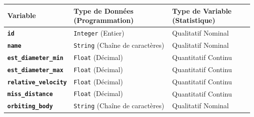\documentclass[11pt]{article}
\begin{document}
\begin{longtable}[]{@{}
  >{\raggedright\arraybackslash}p{}
  >{\raggedright\arraybackslash}p{}
  >{\raggedright\arraybackslash}p{}@{}}
  \toprule\noalign{}
  \begin{minipage}[b]{\linewidth}\raggedright
    Variable
  \end{minipage} & \begin{minipage}[b]{\linewidth}\raggedright
                     Type de Données (Programmation)
                   \end{minipage} & \begin{minipage}[b]{\linewidth}\raggedright
                                      Type de Variable (Statistique)
                                    \end{minipage}                                   \\
  \midrule\noalign{}
  \endhead
  \bottomrule\noalign{}
  \endlastfoot
  \textbf{\texttt{id}}                        & \texttt{Integer} (Entier)                   & Qualitatif Nominal \\
  \textbf{\texttt{name}}                      & \texttt{String} (Chaîne de caractères)      &
  Qualitatif Nominal                                                                                             \\
  \textbf{\texttt{est\_diameter\_min}}        & \texttt{Float} (Décimal)                    &
  Quantitatif Continu                                                                                            \\
  \textbf{\texttt{est\_diameter\_max}}        & \texttt{Float} (Décimal)                    &
  Quantitatif Continu                                                                                            \\
  \textbf{\texttt{relative\_velocity}}        & \texttt{Float} (Décimal)                    &
  Quantitatif Continu                                                                                            \\
  \textbf{\texttt{miss\_distance}}            & \texttt{Float} (Décimal)                    &
  Quantitatif Continu                                                                                            \\
  \textbf{\texttt{orbiting\_body}}            & \texttt{String} (Chaîne de
  caractères)                                 & Qualitatif Nominal                                               \\

\end{longtable}
\end{document}
